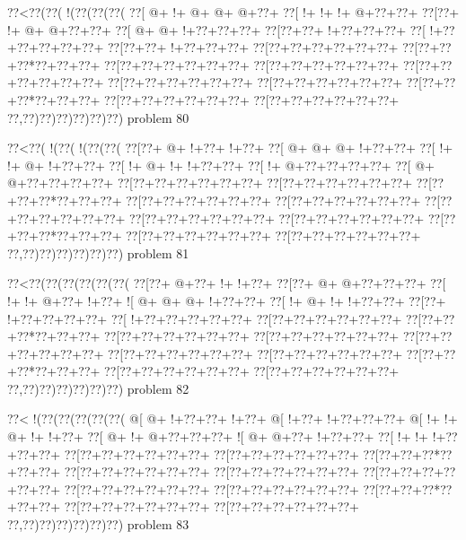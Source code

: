 \vbox{\vbox{\goo
\0??<\0??(\0??(\- !(\0??(\0??(\0??(
\0??[\- @+\- !+\- @+\- @+\- @+\0??+
\0??[\- !+\- !+\- !+\- @+\0??+\0??+
\0??[\0??+\- !+\- @+\- @+\0??+\0??+
\0??[\- @+\- @+\- !+\0??+\0??+\0??+
\0??[\0??+\0??+\- !+\0??+\0??+\0??+
\0??[\- !+\0??+\0??+\0??+\0??+\0??+
\0??[\0??+\0??+\- !+\0??+\0??+\0??+
\0??[\0??+\0??+\0??+\0??+\0??+\0??+
\0??[\0??+\0??+\0??*\0??+\0??+\0??+
\0??[\0??+\0??+\0??+\0??+\0??+\0??+
\0??[\0??+\0??+\0??+\0??+\0??+\0??+
\0??[\0??+\0??+\0??+\0??+\0??+\0??+
\0??[\0??+\0??+\0??+\0??+\0??+\0??+
\0??[\0??+\0??+\0??+\0??+\0??+\0??+
\0??[\0??+\0??+\0??*\0??+\0??+\0??+
\0??[\0??+\0??+\0??+\0??+\0??+\0??+
\0??[\0??+\0??+\0??+\0??+\0??+\0??+
\0??,\0??)\0??)\0??)\0??)\0??)\0??)
}
\hfil problem 80\hfil\break
}

\vbox{\vbox{\goo
\0??<\0??(\- !(\0??(\- !(\0??(\0??(
\0??[\0??+\- @+\- !+\0??+\- !+\0??+
\0??[\- @+\- @+\- @+\- !+\0??+\0??+
\0??[\- !+\- !+\- @+\- !+\0??+\0??+
\0??[\- !+\- @+\- !+\- !+\0??+\0??+
\0??[\- !+\- @+\0??+\0??+\0??+\0??+
\0??[\- @+\- @+\0??+\0??+\0??+\0??+
\0??[\0??+\0??+\0??+\0??+\0??+\0??+
\0??[\0??+\0??+\0??+\0??+\0??+\0??+
\0??[\0??+\0??+\0??*\0??+\0??+\0??+
\0??[\0??+\0??+\0??+\0??+\0??+\0??+
\0??[\0??+\0??+\0??+\0??+\0??+\0??+
\0??[\0??+\0??+\0??+\0??+\0??+\0??+
\0??[\0??+\0??+\0??+\0??+\0??+\0??+
\0??[\0??+\0??+\0??+\0??+\0??+\0??+
\0??[\0??+\0??+\0??*\0??+\0??+\0??+
\0??[\0??+\0??+\0??+\0??+\0??+\0??+
\0??[\0??+\0??+\0??+\0??+\0??+\0??+
\0??,\0??)\0??)\0??)\0??)\0??)\0??)
}
\hfil problem 81\hfil\break
}

\vbox{\vbox{\goo
\0??<\0??(\0??(\0??(\0??(\0??(\0??(
\0??[\0??+\- @+\0??+\- !+\- !+\0??+
\0??[\0??+\- @+\- @+\0??+\0??+\0??+
\0??[\- !+\- !+\- @+\0??+\- !+\0??+
\- ![\- @+\- @+\- @+\- !+\0??+\0??+
\0??[\- !+\- @+\- !+\- !+\0??+\0??+
\0??[\0??+\- !+\0??+\0??+\0??+\0??+
\0??[\- !+\0??+\0??+\0??+\0??+\0??+
\0??[\0??+\0??+\0??+\0??+\0??+\0??+
\0??[\0??+\0??+\0??*\0??+\0??+\0??+
\0??[\0??+\0??+\0??+\0??+\0??+\0??+
\0??[\0??+\0??+\0??+\0??+\0??+\0??+
\0??[\0??+\0??+\0??+\0??+\0??+\0??+
\0??[\0??+\0??+\0??+\0??+\0??+\0??+
\0??[\0??+\0??+\0??+\0??+\0??+\0??+
\0??[\0??+\0??+\0??*\0??+\0??+\0??+
\0??[\0??+\0??+\0??+\0??+\0??+\0??+
\0??[\0??+\0??+\0??+\0??+\0??+\0??+
\0??,\0??)\0??)\0??)\0??)\0??)\0??)
}
\hfil problem 82\hfil\break
}

\vbox{\vbox{\goo
\0??<\- !(\0??(\0??(\0??(\0??(\0??(
\- @[\- @+\- !+\0??+\0??+\- !+\0??+
\- @[\- !+\0??+\- !+\0??+\0??+\0??+
\- @[\- !+\- !+\- @+\- !+\- !+\0??+
\0??[\- @+\- !+\- @+\0??+\0??+\0??+
\- ![\- @+\- @+\0??+\- !+\0??+\0??+
\0??[\- !+\- !+\- !+\0??+\0??+\0??+
\0??[\0??+\0??+\0??+\0??+\0??+\0??+
\0??[\0??+\0??+\0??+\0??+\0??+\0??+
\0??[\0??+\0??+\0??*\0??+\0??+\0??+
\0??[\0??+\0??+\0??+\0??+\0??+\0??+
\0??[\0??+\0??+\0??+\0??+\0??+\0??+
\0??[\0??+\0??+\0??+\0??+\0??+\0??+
\0??[\0??+\0??+\0??+\0??+\0??+\0??+
\0??[\0??+\0??+\0??+\0??+\0??+\0??+
\0??[\0??+\0??+\0??*\0??+\0??+\0??+
\0??[\0??+\0??+\0??+\0??+\0??+\0??+
\0??[\0??+\0??+\0??+\0??+\0??+\0??+
\0??,\0??)\0??)\0??)\0??)\0??)\0??)
}
\hfil problem 83\hfil\break
}

